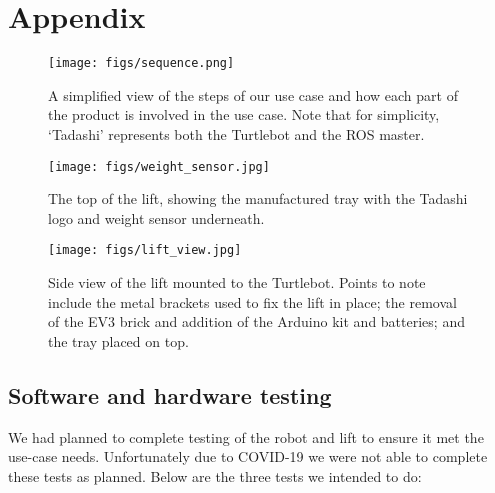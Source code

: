 \documentclass{article}
\begin{document}
\clearpage
\section{Appendix}
\begin{figure}
  \begin{center}
    \texttt{[image: figs/sequence.png]}
  \end{center}
  \caption{A simplified view of the steps of our use case and how each part of the product is involved in the use case. Note that for simplicity, `Tadashi' represents both the Turtlebot and the ROS master.}
  \label{fig:seq}
\end{figure}
\begin{figure}
  \begin{center}
    \texttt{[image: figs/weight\_sensor.jpg]}
    \caption{The top of the lift, showing the manufactured tray with the Tadashi logo and weight sensor underneath.}
  \label{fig:sensor}
  \end{center}
\end{figure}

\begin{figure}
  \begin{center}
    \texttt{[image: figs/lift\_view.jpg]}
    \caption{Side view of the lift mounted to the Turtlebot. Points to note include the metal brackets used to fix the lift in place; the removal of the EV3 brick and addition of the Arduino kit and batteries; and the tray placed on top.}
  \label{fig:lift}
  \end{center}
\end{figure}

\subsection{Software and hardware testing}
We had planned to complete testing of the robot and lift to ensure it met the use-case needs. Unfortunately due to COVID-19 we were not able to complete these tests as planned. Below are the three tests we intended to do:
\end{document}
